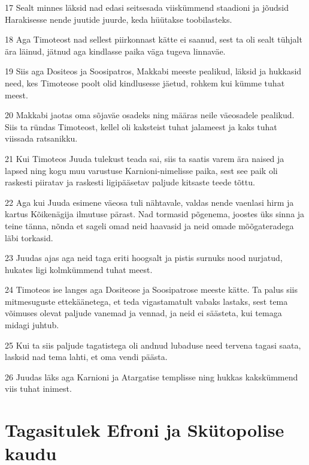 \par 17 Sealt minnes läksid nad edasi seitsesada viiskümmend staadioni ja jõudsid Harakisesse nende juutide juurde, keda hüütakse toobilasteks.
\par 18 Aga Timoteost nad sellest piirkonnast kätte ei saanud, sest ta oli sealt tühjalt ära läinud, jätnud aga kindlasse paika väga tugeva linnaväe.
\par 19 Siis aga Dositeos ja Soosipatros, Makkabi meeste pealikud, läksid ja hukkasid need, kes Timoteose poolt olid kindlusesse jäetud, rohkem kui kümme tuhat meest.
\par 20 Makkabi jaotas oma sõjaväe osadeks ning määras neile väeosadele pealikud. Siis ta ründas Timoteost, kellel oli kaksteist tuhat jalameest ja kaks tuhat viissada ratsanikku.
\par 21 Kui Timoteos Juuda tulekust teada sai, siis ta saatis varem ära naised ja lapsed ning kogu muu varustuse Karnioni-nimelisse paika, sest see paik oli raskesti piiratav ja raskesti ligipääsetav paljude kitsaste teede tõttu.
\par 22 Aga kui Juuda esimene väeosa tuli nähtavale, valdas nende vaenlasi hirm ja kartus Kõikenägija ilmutuse pärast. Nad tormasid põgenema, joostes üks sinna ja teine tänna, nõnda et sageli omad neid haavasid ja neid omade mõõgateradega läbi torkasid.
\par 23 Juudas ajas aga neid taga eriti hoogsalt ja pistis surnuks nood nurjatud, hukates ligi kolmkümmend tuhat meest.
\par 24 Timoteos ise langes aga Dositeose ja Soosipatrose meeste kätte. Ta palus siis mitmesuguste ettekäänetega, et teda vigastamatult vabaks lastaks, sest tema võimuses olevat paljude vanemad ja vennad, ja neid ei säästeta, kui temaga midagi juhtub.
\par 25 Kui ta siis paljude tagatistega oli andnud lubaduse need tervena tagasi saata, lasksid nad tema lahti, et oma vendi päästa.
\par 26 Juudas läks aga Karnioni ja Atargatise templisse ning hukkas kakskümmend viis tuhat inimest.


\section*{Tagasitulek Efroni ja Skütopolise kaudu}

